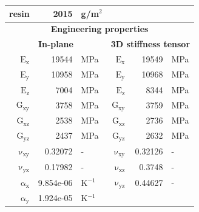\begin{table}[!htbp]
\begin{tabular}[t]{rrlrrl}
      resin & 2015 & g/m$^2$\\
      \midrule
      \multicolumn{6}{c}{\small\textbf{Engineering properties}}\\[0.1em]
      \multicolumn{3}{c}{\small\textbf{In-plane}} & 
      \multicolumn{3}{c}{\small\textbf{3D stiffness tensor}}\\[0.1em]
      $\mathrm{E_x}$ & 19544 & MPa & $\mathrm{E_x}$ & 19549 & MPa\\
      $\mathrm{E_y}$ & 10958 & MPa & $\mathrm{E_y}$ & 10968 & MPa\\
      $\mathrm{E_z}$ & 7004 & MPa & $\mathrm{E_z}$ & 8344 & MPa\\
      $\mathrm{G_{xy}}$ & 3758 & MPa & $\mathrm{G_{xy}}$ & 3759 & MPa\\
      $\mathrm{G_{xz}}$ & 2538 & MPa & $\mathrm{G_{xz}}$ & 2736 & MPa\\
      $\mathrm{G_{yz}}$ & 2437 & MPa & $\mathrm{G_{yz}}$ & 2632 & MPa\\
      $\mathrm{\nu_{xy}}$ & 0.32072 &- & $\mathrm{\nu_{xy}}$ & 0.32126 &-\\
      $\mathrm{\nu_{yx}}$ & 0.17982 &- & $\mathrm{\nu_{xz}}$ & 0.3748 &-\\
      $\mathrm{\alpha_x}$ & 9.854e-06 & K$^{-1}$ & $\mathrm{\nu_{yz}}$ & 0.44627 &-\\
      $\mathrm{\alpha_y}$ & 1.924e-05 & K$^{-1}$\\
      \bottomrule
    \end{tabular}
\end{table}

